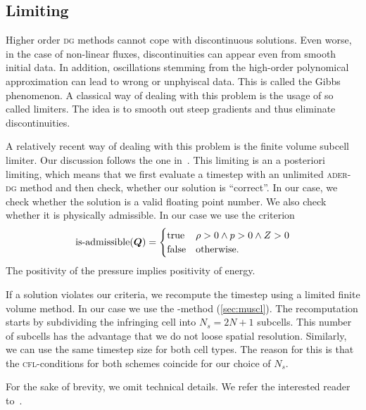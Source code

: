 \subsection{Limiting}\label{sec:limiting}
Higher order \textsc{dg} methods cannot cope with discontinuous solutions.
Even worse, in the case of non-linear fluxes, discontinuities can appear even from smooth initial data.
In addition, oscillations stemming from the high-order polynomical approximation can lead to wrong or unphyiscal data.
This is called the Gibbs phenomenon.
A classical way of dealing with this problem is the usage of so called limiters.
The idea is to smooth out steep gradients and thus eliminate discontinuities.

A relatively recent way of dealing with this problem is the finite volume subcell limiter.
Our discussion follows the one in~\cite{dumbser2016simple}.
This limiting is an a posteriori limiting, which means that we first evaluate a timestep with an unlimited \textsc{ader-dg} method and then check, whether our solution is \enquote{correct}.
In our case, we check whether the solution is a valid floating point number.
We also check whether it is physically admissible.
In our case we use the criterion
\begin{equation}
  \label{eq:limiting-physical}
  \operatorname{is-admissible}(\bm{Q}) =
  \begin{cases}
    \text{true} & \rho > 0 \land p > 0 \land Z > 0 \\
    \text{false} & \text{otherwise}.
  \end{cases}
\end{equation}
The positivity of the pressure implies positivity of energy.

If a solution violates our criteria, we recompute the timestep using a limited finite volume method.
In our case we use the \muscl{}-method (\cref{sec:muscl}).
The recomputation starts by subdividing the infringing cell into $N_s = 2N + 1$ subcells.
This number of subcells has the advantage that we do not loose spatial resolution.
Similarly, we can use the same timestep size for both cell types.
The reason for this is that the \textsc{cfl}-conditions for both schemes  coincide for our choice of $N_s$.

For the sake of brevity, we omit technical details.
We refer the interested reader to~\cite{dumbser2016simple}.

